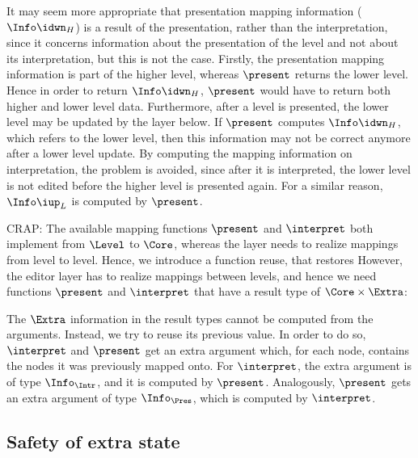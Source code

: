 It may seem more appropriate that presentation mapping information ($\Info\idwn_{H}$) is a result of the presentation, rather than the interpretation, since it concerns information about the presentation of the level and not about its interpretation, but this is not the case. Firstly, the presentation mapping information is part of the higher level, whereas $\present$ returns the lower level. Hence in order to return $\Info\idwn_{H}$, $\present$ would have to return both higher and lower level data.  Furthermore, after a level is presented, the lower level may be updated by the layer below. If $\present$ computes $\Info\idwn_{H}$, which refers to the lower level, then this information may not be correct anymore after a lower level update. By computing the mapping information on interpretation, the problem is avoided, since after it is interpreted, the lower level is not edited before the higher level is presented again. For a similar reason, $\Info\iup_{L}$ is computed by $\present$.



\bc CRAP:
The available mapping functions $\present$ and $\interpret$ both implement from $\Level$ to $\Core$, whereas the layer needs to realize mappings from level to level. Hence, we introduce a function reuse, that restores However, the editor layer has to realize mappings between levels, and hence we need functions $\present$ and $\interpret$ that have a result type of $\Core \times \Extra$:

The $\Extra$ information in the result types cannot be computed from the arguments. Instead, we try to reuse its previous value. In order to do so, $\interpret$ and $\present$ get an extra argument which, for each node, contains the nodes it was previously mapped onto. For $\interpret$, the extra argument is of type $\Info_{\Intr}$, and it is computed by $\present$. Analogously, $\present$ gets an extra argument of type $\Info_{\Pres}$, which is computed by $\interpret$. 
\ec

%																
\subsection{Safety of extra state}

